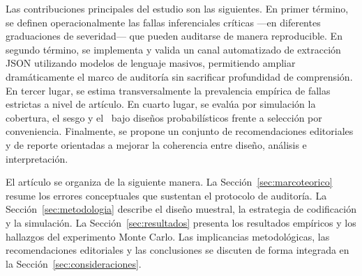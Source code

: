 Las contribuciones principales del estudio son las siguientes. En primer término, se definen operacionalmente las fallas inferenciales críticas ---en diferentes graduaciones de severidad--- que pueden auditarse de manera reproducible. En segundo término, se implementa y valida un canal automatizado de extracción JSON utilizando modelos de lenguaje masivos, permitiendo ampliar dramáticamente el marco de auditoría sin sacrificar profundidad de comprensión. En tercer lugar, se estima transversalmente la prevalencia empírica de fallas estrictas a nivel de artículo. En cuarto lugar, se evalúa por simulación la cobertura, el sesgo y el \RMSE\ bajo diseños probabilísticos frente a selección por conveniencia. Finalmente, se propone un conjunto de recomendaciones editoriales y de reporte orientadas a mejorar la coherencia entre diseño, análisis e interpretación.

El artículo se organiza de la siguiente manera. La Sección~\ref{sec:marcoteorico} resume los errores conceptuales que sustentan el protocolo de auditoría. La Sección~\ref{sec:metodologia} describe el diseño muestral, la estrategia de codificación y la simulación. La Sección~\ref{sec:resultados} presenta los resultados empíricos y los hallazgos del experimento Monte Carlo. Las implicancias metodológicas, las recomendaciones editoriales y las conclusiones se discuten de forma integrada en la Sección~\ref{sec:consideraciones}.
